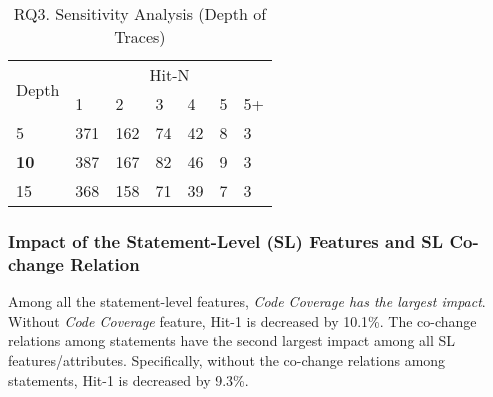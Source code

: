 \begin{table}[t]
	\caption{RQ3. Sensitivity Analysis (Depth of Traces)}
        \vspace{-9pt}
	{\small
		\begin{center}
			\renewcommand{\arraystretch}{1}
			\begin{tabular}{p{1cm}|p{0.3cm}<{\centering}|p{0.3cm}<{\centering}|p{0.3cm}<{\centering}|p{0.3cm}<{\centering}|p{0.3cm}<{\centering}|p{0.3cm}<{\centering}}
				\hline
				\multirow{2}{*}{Depth}    & \multicolumn{6}{c}{Hit-N}\\
				\cline{2-7}
				&1&2&3&4&5&5+\\
				
				\hline 
				5 			                & 371 & 162 & 74  & 42 & 8 & 3 \\
			{\bf	10}                         & 387 & 167 & 82  & 46 & 9 & 3   \\
				15	                        & 368 & 158 & 71  & 39 & 7 & 3 \\
				\hline
			\end{tabular}
			
			\label{fig:rq3-2}
		\end{center}
	}
\end{table}



\subsubsection{Impact of the Statement-Level (SL) Features and SL Co-change Relation}

Among all the statement-level features, {\it Code Coverage
has the largest impact}. Without {\it Code Coverage} feature,
Hit-1 is decreased by 10.1\%.
%
The co-change relations among statements have the second largest
impact among all SL features/attributes. Specifically, without
the co-change relations among statements, Hit-1 is decreased by 9.3\%.





